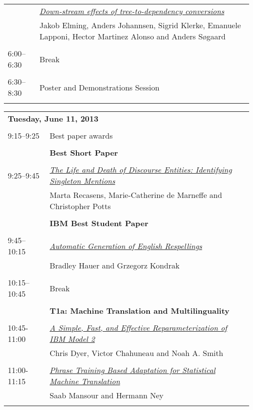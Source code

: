 \begin{tabular}{p{20mm}p{138mm}}
 & \hyperlink{page.617}{\em Down-stream effects of tree-to-dependency conversions}\\
         & Jakob Elming, Anders Johannsen, Sigrid Klerke, Emanuele Lapponi, Hector Martinez Alonso and Anders S{\o}gaard \\
\\

6:00--6:30 & Break
 \\
\\
6:30--8:30 & Poster and Demonstrations Session
 \\
\\
\end{tabular}
\newpage
\begin{tabular}{p{20mm}p{138mm}}
\\
\multicolumn{2}{l}{\bf Tuesday, June 11, 2013
} \\
\\
9:15--9:25 & Best paper awards
 \\
\\
 & {\bf Best Short Paper
} \\
\\
9:25--9:45 & \hyperlink{page.627}{\em The Life and Death of Discourse Entities: Identifying Singleton Mentions}\\
         & Marta Recasens, Marie-Catherine de Marneffe and Christopher Potts \\
\\

 & {\bf IBM Best Student Paper
} \\
\\
9:45--10:15 & \hyperlink{page.634}{\em Automatic Generation of English Respellings}\\
         & Bradley Hauer and Grzegorz Kondrak \\
\\

10:15--10:45 & Break
 \\
\\
 & {\bf T1a: Machine Translation and Multilinguality
} \\
\\
10:45-11:00 & \hyperlink{page.644}{\em A Simple, Fast, and Effective Reparameterization of IBM Model 2}\\
         & Chris Dyer, Victor Chahuneau and Noah A. Smith \\
\\

11:00-11:15 & \hyperlink{page.649}{\em Phrase Training Based Adaptation for Statistical Machine Translation}\\
         & Saab Mansour and Hermann Ney \\
\\


\end{tabular}
